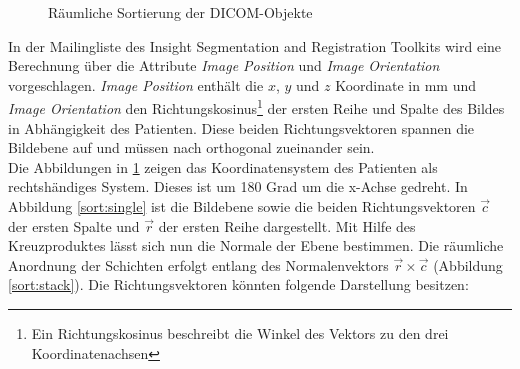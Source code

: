 \begin{figure}[htb]
\centering
{}
\caption{Räumliche Sortierung der DICOM-Objekte}
\label{sort}
\end{figure}

In der Mailingliste des Insight Segmentation and Registration Toolkits \cite{itk:mail} wird eine Berechnung über die Attribute \textit{Image Position} und \textit{Image Orientation} vorgeschlagen.
\textit{Image Position} enthält die $x$, $y$ und $z$ Koordinate in mm und \textit{Image Orientation} den Richtungskosinus\footnote{Ein Richtungskosinus beschreibt die Winkel des Vektors zu den drei Koordinatenachsen} der ersten Reihe und Spalte des Bildes in Abhängigkeit des Patienten. Diese beiden Richtungsvektoren spannen die Bildebene auf und müssen nach \cite[C.7.6.2.1.1]{dicom:iod} orthogonal zueinander sein.\\
Die Abbildungen in \ref{sort} zeigen das Koordinatensystem des Patienten als rechtshändiges System\cite[S.419]{dicom:iod}. Dieses ist um 180 Grad um die x-Achse gedreht. In Abbildung \ref{sort:single} ist die Bildebene sowie die beiden Richtungsvektoren $\vec{c}$ der ersten Spalte und $\vec{r}$ der ersten Reihe dargestellt. Mit Hilfe des Kreuzproduktes lässt sich nun die Normale der Ebene bestimmen. Die räumliche Anordnung der Schichten erfolgt entlang des Normalenvektors $\vec{r} \times \vec{c}$ (Abbildung \ref{sort:stack}). Die Richtungsvektoren könnten folgende Darstellung besitzen:

